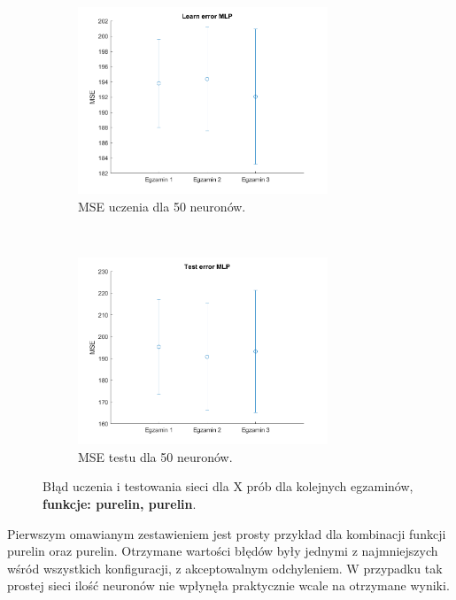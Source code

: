 \documentclass[12pt]{article}
\begin{document}
\begin{figure}[H]
\begin{subfigure}[t]{0.48\textwidth} 
\centering
\includegraphics[height=2.2in]{purelin_purelin_50_learn.png}
\caption{MSE uczenia dla 50 neuronów.}
\end{subfigure}
~~
\begin{subfigure}[t]{0.48\textwidth} 
\centering
\includegraphics[height=2.2in]{purelin_purelin_50_test.png}
\caption{MSE testu dla 50 neuronów.}
\end{subfigure}
\caption{Błąd uczenia i testowania sieci dla X prób dla kolejnych egzaminów, \textbf{funkcje: purelin, purelin}.}
\end{figure}

Pierwszym omawianym zestawieniem jest prosty przykład dla kombinacji funkcji purelin oraz purelin. Otrzymane wartości błędów były jednymi z najmniejszych wśród wszystkich konfiguracji, z akceptowalnym odchyleniem. W przypadku tak prostej sieci ilość neuronów nie wpłynęła praktycznie wcale na otrzymane wyniki.
\end{document}
